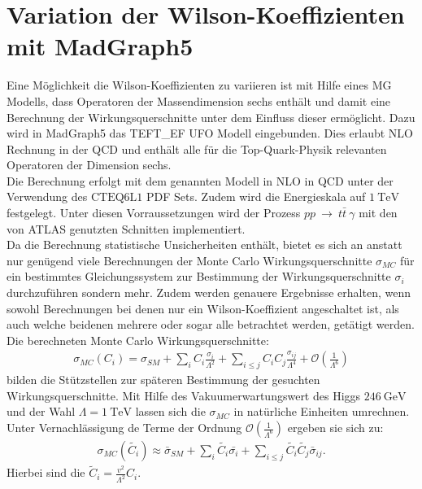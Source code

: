 \section{Variation der Wilson-Koeffizienten mit MadGraph5}
Eine Möglichkeit die Wilson-Koeffizienten zu variieren ist mit Hilfe eines MG Modells, dass Operatoren der Massendimension sechs enthält und damit eine Berechnung der Wirkungsquerschnitte unter dem Einfluss dieser ermöglicht. Dazu wird in MadGraph5 das TEFT\_EF UFO Modell\cite{EFTModell} eingebunden. Dies erlaubt NLO Rechnung in der QCD und enthält alle für die Top-Quark-Physik relevanten Operatoren der Dimension sechs.\\
Die Berechnung erfolgt mit dem genannten Modell in NLO in QCD unter der Verwendung des $\text{CTEQ}6\text{L}1$ PDF Sets. Zudem wird die Energieskala auf $\SI{1}{\tera\electronvolt}$ festgelegt. Unter diesen Vorraussetzungen wird der Prozess $pp~\rightarrow~t\bar{t}~\gamma$ mit den von ATLAS genutzten Schnitten implementiert.\\
Da die Berechnung statistische Unsicherheiten enthält, bietet es sich an anstatt nur genügend viele Berechnungen der Monte Carlo Wirkungsquerschnitte $\sigma_{MC}$ für ein bestimmtes Gleichungssystem zur Bestimmung der Wirkungsquerschnitte $\sigma_i$ durchzuführen sondern mehr. Zudem werden genauere Ergebnisse erhalten, wenn sowohl Berechnungen bei denen nur ein Wilson-Koeffizient angeschaltet ist, als auch welche beidenen mehrere oder sogar alle betrachtet werden, getätigt werden.\\
Die berechneten Monte Carlo Wirkungsquerschnitte:
\begin{align}
  \sigma_{MC}({C_i}) = \sigma_{SM} + \sum_{i} C_i \frac{\sigma_i}{\Lambda^2} + \sum_{i \leq j} C_i C_j \frac{\sigma_{ij}}{\Lambda^4} + \mathcal{O}(\frac{1}{\Lambda^6})
\end{align}
bilden die Stützstellen zur späteren Bestimmung der gesuchten Wirkungsquerschnitte. Mit Hilfe des Vakuumerwartungswert des Higgs $\SI{246}{\giga\electronvolt}$ und der Wahl $\Lambda = \SI{1}{\tera\electronvolt}$ lassen sich die $\sigma_{MC}$ in natürliche Einheiten umrechnen. Unter Vernachlässigung de Terme der Ordnung $\mathcal{O}(\frac{1}{\Lambda^6})$ ergeben sie sich zu:
\begin{align}
  \sigma_{MC}({\tilde{C_i}}) \approx \bar{\sigma}_{SM} + \sum_{i} \tilde{C_i} \bar{\sigma_i} + \sum_{i \leq j} \tilde{C_i} \tilde{C_j} \bar{\sigma}_{ij}.
\end{align}
Hierbei sind die $\tilde{C}_i = \frac{v^2}{\Lambda^2} C_i$.
